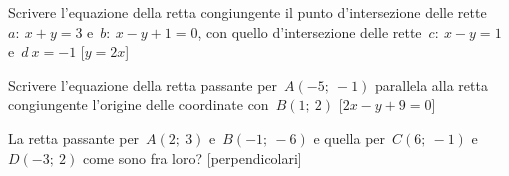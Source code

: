 \begin{esercizio}\label{ese:02_01.}
Scrivere l'equazione della retta congiungente il punto d'intersezione delle 
rette~\(a:~x + y = 3\) e~\(b:~x - y + 1 = 0\), con quello d'intersezione delle 
rette~\(c:~x - y = 1\) e~\(d~x = -1\)
 \hfill[\(y = 2x\)]
\end{esercizio}

\begin{esercizio}\label{ese:02_01.}
Scrivere l'equazione della retta passante per~\(A(-5;~-1)\) parallela alla retta 
congiungente l'origine delle coordinate con~\(B(1;~2)\)
 \hfill[\(2x - y + 9 = 0\)]
\end{esercizio}

\begin{esercizio}\label{ese:02_01.}
La retta passante per~\(A(2;~3)\) e~\(B(-1;~-6)\) e quella per~\(C(6;~-1)\)
e~\(D(-3;~2)\) come sono fra loro?
 \hfill[perpendicolari]
\end{esercizio}

% 


